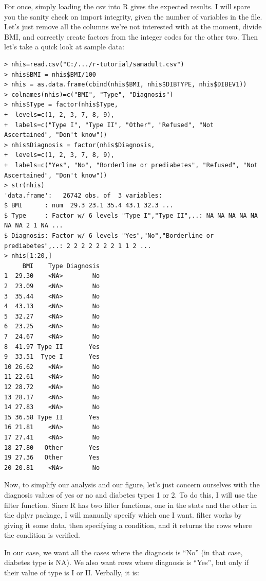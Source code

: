 \documentclass{report}
\newcommand{\code}[1]{\textsf{\ttfamily #1}}
\begin{document}
	For once, simply loading the csv into R gives the expected results. I will spare you the sanity check on import integrity, given the number of variables in the file. Let's just remove all the columns we're not interested with at the moment, divide BMI, and correctly create factors from the integer codes for the other two. Then let's take a quick look at sample data:
	\begin{verbatim}
> nhis=read.csv("C:/.../r-tutorial/samadult.csv")
> nhis$BMI = nhis$BMI/100
> nhis = as.data.frame(cbind(nhis$BMI, nhis$DIBTYPE, nhis$DIBEV1))
> colnames(nhis)=c("BMI", "Type", "Diagnosis")
> nhis$Type = factor(nhis$Type, 
+  levels=c(1, 2, 3, 7, 8, 9), 
+  labels=c("Type I", "Type II", "Other", "Refused", "Not Ascertained", "Don't know"))
> nhis$Diagnosis = factor(nhis$Diagnosis, 
+  levels=c(1, 2, 3, 7, 8, 9), 
+  labels=c("Yes", "No", "Borderline or prediabetes", "Refused", "Not Ascertained", "Don't know"))
> str(nhis)
'data.frame':   26742 obs. of  3 variables:
$ BMI      : num  29.3 23.1 35.4 43.1 32.3 ...
$ Type     : Factor w/ 6 levels "Type I","Type II",..: NA NA NA NA NA NA NA 2 1 NA ...
$ Diagnosis: Factor w/ 6 levels "Yes","No","Borderline or prediabetes",..: 2 2 2 2 2 2 2 1 1 2 ...
> nhis[1:20,]
     BMI    Type Diagnosis
1  29.30    <NA>        No
2  23.09    <NA>        No
3  35.44    <NA>        No
4  43.13    <NA>        No
5  32.27    <NA>        No
6  23.25    <NA>        No
7  24.67    <NA>        No
8  41.97 Type II       Yes
9  33.51  Type I       Yes
10 26.62    <NA>        No
11 22.61    <NA>        No
12 28.72    <NA>        No
13 28.17    <NA>        No
14 27.83    <NA>        No
15 36.58 Type II       Yes
16 21.81    <NA>        No
17 27.41    <NA>        No
18 27.80   Other       Yes
19 27.36   Other       Yes
20 20.81    <NA>        No
	\end{verbatim}
	
	Now, to simplify our analysis and our figure, let's just concern ourselves with the diagnosis values of yes or no and diabetes types 1 or 2. To do this, I will use the \code{filter} function. Since R has two \code{filter} functions, one in the \code{stats} and the other in the \code{dplyr} package, I will manually specify which one I want. \code{filter} works by giving it some data, then specifying a condition, and it returns the rows where the condition is verified.
	
	In our case, we want all the cases where the diagnosis is ``No'' (in that case, diabetes type is NA). We also want rows where diagnosis is ``Yes'', but only if their value of type is I or II. Verbally, it is:
	
\end{document}
